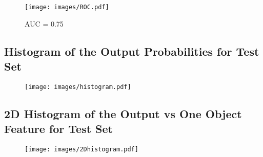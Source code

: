 \documentclass{article}%
\begin{document}
\begin{figure}[h!]%
\centering%
\texttt{[image: images/ROC.pdf]}%
\hspace*{2cm}%
\begin{large}%
AUC = 0.75\newline%
\newline%
\newline%
\newline%
\newline%
\newline%
\newline%
\newline%
%
\end{large}%
\end{figure}

%
\subsection*{Histogram of the Output Probabilities for Test Set}%
\label{subsec:HistogramoftheOutputProbabilitiesforTestSet}%


\begin{figure}[h!]%
\centering%
\texttt{[image: images/histogram.pdf]}%
\end{figure}

%
\subsection*{2D Histogram of the Output vs One Object Feature for Test Set}%
\label{subsec:2DHistogramoftheOutputvsOneObjectFeatureforTestSet}%


\begin{figure}[h!]%
\centering%
\texttt{[image: images/2Dhistogram.pdf]}%
\end{figure}

%
\end{document}
